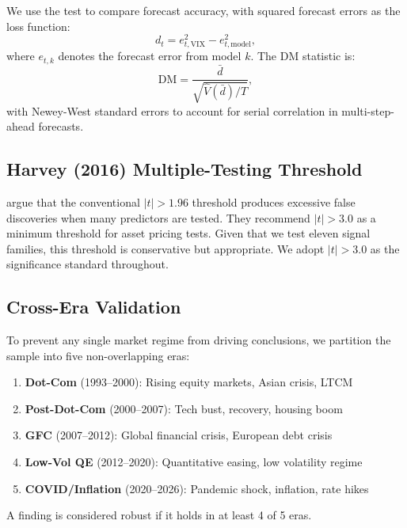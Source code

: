 \documentclass[12pt,a4paper]{article}
\begin{document}
We use the \citet{diebold1995} test to compare forecast accuracy, with squared forecast errors as the loss function:
\begin{equation}
d_t = e_{t,\text{VIX}}^2 - e_{t,\text{model}}^2,
\label{eq:dm}
\end{equation}
where $e_{t,k}$ denotes the forecast error from model $k$. The DM statistic is:
\begin{equation}
\text{DM} = \frac{\bar{d}}{\sqrt{\hat{V}(\bar{d})/T}},
\label{eq:dm_stat}
\end{equation}
with Newey-West standard errors to account for serial correlation in multi-step-ahead forecasts.

\subsection{Harvey (2016) Multiple-Testing Threshold}

\citet{harvey2016} argue that the conventional $|t| > 1.96$ threshold produces excessive false discoveries when many predictors are tested. They recommend $|t| > 3.0$ as a minimum threshold for asset pricing tests. Given that we test eleven signal families, this threshold is conservative but appropriate. We adopt $|t| > 3.0$ as the significance standard throughout.

\subsection{Cross-Era Validation}

To prevent any single market regime from driving conclusions, we partition the sample into five non-overlapping eras:

\begin{enumerate}
    \item \textbf{Dot-Com} (1993--2000): Rising equity markets, Asian crisis, LTCM
    \item \textbf{Post-Dot-Com} (2000--2007): Tech bust, recovery, housing boom
    \item \textbf{GFC} (2007--2012): Global financial crisis, European debt crisis
    \item \textbf{Low-Vol QE} (2012--2020): Quantitative easing, low volatility regime
    \item \textbf{COVID/Inflation} (2020--2026): Pandemic shock, inflation, rate hikes
\end{enumerate}

A finding is considered robust if it holds in at least 4 of 5 eras.
\end{document}
